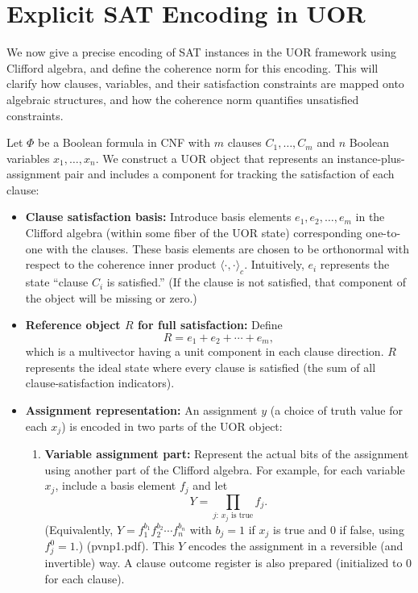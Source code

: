 \documentclass{article}
\begin{document}
\section{Explicit SAT Encoding in UOR}

We now give a precise encoding of SAT instances in the UOR framework using Clifford algebra, and define the coherence norm for this encoding. This will clarify how clauses, variables, and their satisfaction constraints are mapped onto algebraic structures, and how the coherence norm quantifies unsatisfied constraints.

Let $\Phi$ be a Boolean formula in CNF with $m$ clauses $C_1,\dots, C_m$ and $n$ Boolean variables $x_1,\dots,x_n$. We construct a UOR object that represents an instance-plus-assignment pair and includes a component for tracking the satisfaction of each clause:
\begin{itemize}
    \item \textbf{Clause satisfaction basis:} Introduce basis elements $e_1, e_2, \dots, e_m$ in the Clifford algebra (within some fiber of the UOR state) corresponding one-to-one with the clauses. These basis elements are chosen to be orthonormal with respect to the coherence inner product $\langle \cdot,\cdot \rangle_c$. Intuitively, $e_i$ represents the state ``clause $C_i$ is satisfied.'' (If the clause is not satisfied, that component of the object will be missing or zero.)
    \item \textbf{Reference object $R$ for full satisfaction:} Define 
    \[
    R = e_1 + e_2 + \cdots + e_m,
    \]
    which is a multivector having a unit component in each clause direction. $R$ represents the ideal state where every clause is satisfied (the sum of all clause-satisfaction indicators).
    \item \textbf{Assignment representation:} An assignment $y$ (a choice of truth value for each $x_j$) is encoded in two parts of the UOR object:
    \begin{enumerate}
        \item \textbf{Variable assignment part:} Represent the actual bits of the assignment using another part of the Clifford algebra. For example, for each variable $x_j$, include a basis element $f_j$ and let 
        \[
        Y = \prod_{j:\, x_j \text{ is true}} f_j.
        \]
        (Equivalently, $Y = f_1^{b_1} f_2^{b_2}\cdots f_n^{b_n}$ with $b_j=1$ if $x_j$ is true and $0$ if false, using $f_j^0=1$.) (pvnp1.pdf). This $Y$ encodes the assignment in a reversible (and invertible) way. A clause outcome register is also prepared (initialized to 0 for each clause).

\end{enumerate}
\end{itemize}
\end{document}
